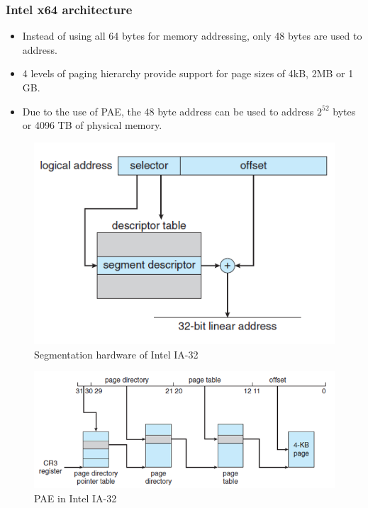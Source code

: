 \documentclass{article}
\theoremstyle{plain}
\theoremstyle{definition}
\begin{document}
\subsubsection{Intel x64 architecture}
\begin{itemize}
    \item Instead of using all 64 bytes for memory addressing, only 48 bytes are used to address.
    
    \item 4 levels of paging hierarchy provide support for page sizes of 4kB, 2MB or 1 GB. 
    
    \item Due to the use of PAE, the 48 byte address can be used to address $2^{52}$ bytes or 4096 TB of physical memory. 
\end{itemize}

\begin{figure}[!ht]
    \centering
    \includegraphics[scale=0.9]{os15.png}
    \caption{Segmentation hardware of Intel IA-32}
    \label{fig:my_label_15}
\end{figure}

\begin{figure}[!h]
    \centering
    \includegraphics[scale=0.8]{os16.png}
    \caption{PAE in Intel IA-32}
    \label{fig:my_label_16}
\end{figure}
\end{document}
